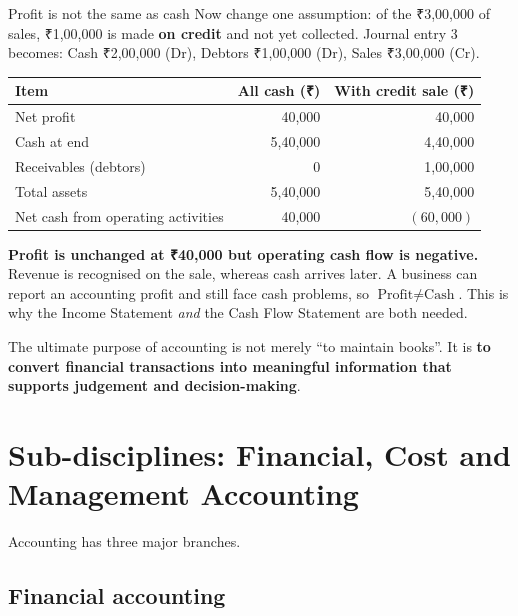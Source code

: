 \documentclass[11pt,a4paper]{article}
\newcommand{\Rs}{{\rsfont ₹}}
\begin{document}
\begin{casebox}{Profit is not the same as cash}
Now change one assumption: of the \Rs 3,00,000 of sales, \Rs 1,00,000 is made \textbf{on credit}
and not yet collected. Journal entry 3 becomes: Cash \Rs 2,00,000 (Dr), Debtors \Rs 1,00,000
(Dr), Sales \Rs 3,00,000 (Cr).
\begin{center}
\small
\begin{tabularx}{\textwidth}{@{}Y r r@{}}
\toprule
{}\textbf{Item} & \textbf{All cash (\Rs)} & \textbf{With credit sale (\Rs)}\\
\midrule
Net profit & 40,000 & 40,000\\
Cash at end & 5,40,000 & 4,40,000\\
Receivables (debtors) & 0 & 1,00,000\\
Total assets & 5,40,000 & 5,40,000\\
Net cash from operating activities & 40,000 & $(60{,}000)$\\
\bottomrule
\end{tabularx}
\end{center}
\textbf{Profit is unchanged at \Rs 40,000 but operating cash flow is negative.} Revenue is
recognised on the sale, whereas cash arrives later. A business can report an accounting profit and
still face cash problems, so $\text{Profit}\neq\text{Cash}$. This is why the Income Statement
\emph{and} the Cash Flow Statement are both needed.
\end{casebox}

\begin{keybox}
The ultimate purpose of accounting is not merely ``to maintain books''. It is \textbf{to convert
financial transactions into meaningful information that supports judgement and decision-making}.
\end{keybox}

\section[Branches of Accounting]{Sub-disciplines: Financial, Cost and Management Accounting}

Accounting has three major branches.

\subsection{Financial accounting}
\end{document}
